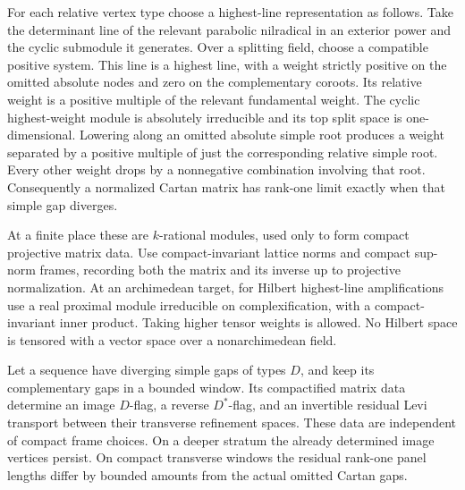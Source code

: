 For each relative vertex type choose a highest-line representation
as follows.  Take the determinant line of the relevant parabolic
nilradical in an exterior power and the cyclic submodule it generates.
Over a splitting field, choose a compatible positive system.  This
line is a highest line, with a weight strictly positive on the omitted
absolute nodes and zero on the complementary coroots.  Its relative
weight is a positive multiple of the relevant fundamental weight.
The cyclic highest-weight module is absolutely irreducible and its
top split space is one-dimensional.  Lowering along an omitted
absolute simple root produces a weight separated by a positive
multiple of just the corresponding relative simple root.  Every
other weight drops by a nonnegative combination involving that root.
Consequently a normalized Cartan matrix has rank-one limit exactly
when that simple gap diverges.

At a finite place these are $k$-rational modules, used only to form
compact projective matrix data.  Use compact-invariant lattice norms
and compact sup-norm frames, recording both the matrix and its inverse
up to projective normalization.  At an archimedean target, for Hilbert
highest-line amplifications use a real proximal module irreducible
on complexification, with a compact-invariant inner product.  Taking
higher tensor weights is allowed.  No Hilbert space is tensored with
a vector space over a nonarchimedean field.

\begin{lemma}
\label{lem:setup-face-blocks}
Let a sequence have diverging simple gaps of types $D$, and keep its
complementary gaps in a bounded window.  Its compactified matrix data
determine an image $D$-flag, a reverse $D^*$-flag, and an invertible
residual Levi transport between their transverse refinement spaces.
These data are independent of compact frame choices.  On a deeper
stratum the already determined image vertices persist.  On compact
transverse windows the residual rank-one panel lengths differ by
bounded amounts from the actual omitted Cartan gaps.
\end{lemma}

